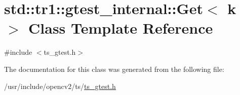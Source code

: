 \hypertarget{classstd_1_1tr1_1_1gtest__internal_1_1Get}{\section{std\-:\-:tr1\-:\-:gtest\-\_\-internal\-:\-:Get$<$ k $>$ Class Template Reference}
\label{classstd_1_1tr1_1_1gtest__internal_1_1Get}
}


{\ttfamily \#include $<$ts\-\_\-gtest.\-h$>$}



The documentation for this class was generated from the following file\-:\begin{DoxyCompactItemize}
\item 
/usr/include/opencv2/ts/\hyperlink{ts__gtest_8h}{ts\-\_\-gtest.\-h}\end{DoxyCompactItemize}
